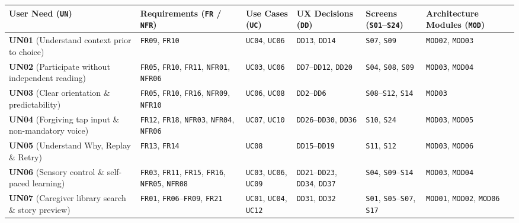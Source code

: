 \begin{footnotesize}
\noindent\begin{xltabular}{\textwidth}{|p{1.5cm}|p{2.2cm}|X|p{2.0cm}|p{2.0cm}|p{1.8cm}|}
\hline
\textbf{User Need (\texttt{UN})} & \textbf{Requirements (\texttt{FR} / \texttt{NFR})} & \textbf{Use Cases (\texttt{UC})} & \textbf{UX Decisions (\texttt{DD})} & \textbf{Screens (\texttt{S01}–\texttt{S24})} & \textbf{Architecture Modules (\texttt{MOD})} \\ \hline
\endhead
\textbf{UN01} (Understand context prior to choice) & \texttt{FR09}, \texttt{FR10} & \texttt{UC04}, \texttt{UC06} & \texttt{DD13}, \texttt{DD14} & \texttt{S07}, \texttt{S09} & \texttt{MOD02}, \texttt{MOD03} \\ \hline
\textbf{UN02} (Participate without independent reading) & \texttt{FR05}, \texttt{FR10}, \texttt{FR11}, \texttt{NFR01}, \texttt{NFR06} & \texttt{UC03}, \texttt{UC06} & \texttt{DD7}–\texttt{DD12}, \texttt{DD20} & \texttt{S04}, \texttt{S08}, \texttt{S09} & \texttt{MOD03}, \texttt{MOD04} \\ \hline
\textbf{UN03} (Clear orientation \& predictability) & \texttt{FR05}, \texttt{FR10}, \texttt{FR16}, \texttt{NFR09}, \texttt{NFR10} & \texttt{UC06}, \texttt{UC08} & \texttt{DD2}–\texttt{DD6} & \texttt{S08}–\texttt{S12}, \texttt{S14} & \texttt{MOD03} \\ \hline
\textbf{UN04} (Forgiving tap input \& non-mandatory voice) & \texttt{FR12}, \texttt{FR18}, \texttt{NFR03}, \texttt{NFR04}, \texttt{NFR06} & \texttt{UC07}, \texttt{UC10} & \texttt{DD26}–\texttt{DD30}, \texttt{DD36} & \texttt{S10}, \texttt{S24} & \texttt{MOD03}, \texttt{MOD05} \\ \hline
\textbf{UN05} (Understand Why, Replay \& Retry) & \texttt{FR13}, \texttt{FR14} & \texttt{UC08} & \texttt{DD15}–\texttt{DD19} & \texttt{S11}, \texttt{S12} & \texttt{MOD03}, \texttt{MOD06} \\ \hline
\textbf{UN06} (Sensory control \& self-paced learning) & \texttt{FR03}, \texttt{FR11}, \texttt{FR15}, \texttt{FR16}, \texttt{NFR05}, \texttt{NFR08} & \texttt{UC03}, \texttt{UC06}, \texttt{UC09} & \texttt{DD21}–\texttt{DD23}, \texttt{DD34}, \texttt{DD37} & \texttt{S04}, \texttt{S09}–\texttt{S14} & \texttt{MOD03}, \texttt{MOD04} \\ \hline
\textbf{UN07} (Caregiver library search \& story preview) & \texttt{FR01}, \texttt{FR06}–\texttt{FR09}, \texttt{FR21} & \texttt{UC01}, \texttt{UC04}, \texttt{UC12} & \texttt{DD31}, \texttt{DD32} & \texttt{S01}, \texttt{S05}–\texttt{S07}, \texttt{S17} & \texttt{MOD01}, \texttt{MOD02}, \texttt{MOD06} \\ \hline

\end{xltabular}
\end{footnotesize}

